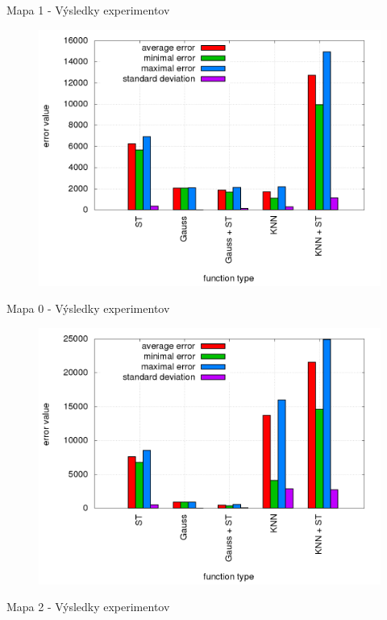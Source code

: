 Mapa 1 - Výsledky experimentov

\begin{figure}[!htb]
\centering
\includegraphics[scale=.36]{../../results_q_learning/map_1/trials_average_results.png}
\end{figure}



Mapa 0 - Výsledky experimentov

\begin{figure}[!htb]
\centering
\includegraphics[scale=.36]{../../results_q_learning/map_0/trials_average_results.png}
\end{figure}


Mapa 2 - Výsledky experimentov

